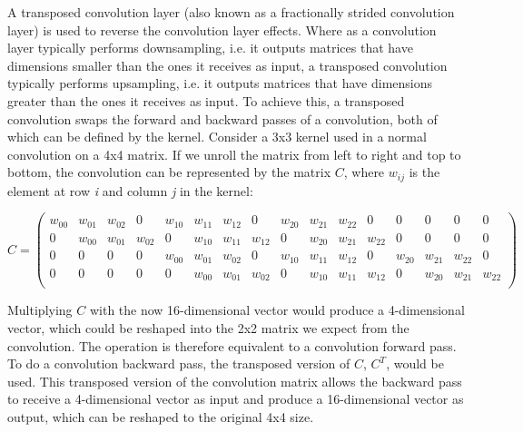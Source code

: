 \noindent A transposed convolution layer (also known as a fractionally strided convolution layer) is used to reverse the convolution layer effects. Where as a convolution layer typically performs downsampling, i.e. it outputs matrices that have dimensions smaller than the ones it receives as input, a transposed convolution typically performs upsampling, i.e. it outputs matrices that have dimensions greater than the ones it receives as input. To achieve this, a transposed convolution swaps the forward and backward passes of a convolution, both of which can be defined by the kernel. Consider a 3x3 kernel used in a normal convolution on a 4x4 matrix. If we unroll the matrix from left to right and top to bottom, the convolution can be represented by the matrix $C$, where \textit{$w_{ij}$} is the element at row \textit{i} and column \textit{j} in the kernel:

\[
    C = 
    \left(
    \begin{smallmatrix}
    \textit{$w_{00}$} & \textit{$w_{01}$} & \textit{$w_{02}$} & 0 & 
    \textit{$w_{10}$} & \textit{$w_{11}$} & \textit{$w_{12}$} & 0 & 
    \textit{$w_{20}$} & \textit{$w_{21}$} & \textit{$w_{22}$} & 0 & 
    0 & 0 & 0 & 0\\
    0 & \textit{$w_{00}$} & \textit{$w_{01}$} & \textit{$w_{02}$} & 
    0 & \textit{$w_{10}$} & \textit{$w_{11}$} & \textit{$w_{12}$} & 
    0 & \textit{$w_{20}$} & \textit{$w_{21}$} & \textit{$w_{22}$} & 
    0 & 0 & 0 & 0\\
    0 & 0 & 0 & 0 & 
    \textit{$w_{00}$} & \textit{$w_{01}$} & \textit{$w_{02}$} & 0 & 
    \textit{$w_{10}$} & \textit{$w_{11}$} & \textit{$w_{12}$} & 0 & 
    \textit{$w_{20}$} & \textit{$w_{21}$} & \textit{$w_{22}$} & 0\\
    0 & 0 & 0 & 0 & 
    0 & \textit{$w_{00}$} & \textit{$w_{01}$} & \textit{$w_{02}$} & 
    0 & \textit{$w_{10}$} & \textit{$w_{11}$} & \textit{$w_{12}$} & 
    0 & \textit{$w_{20}$} & \textit{$w_{21}$} & \textit{$w_{22}$}\\
    \end{smallmatrix}
    \right)
\]

\noindent Multiplying $C$ with the now 16-dimensional vector would produce a 4-dimensional vector, which could be reshaped into the 2x2 matrix we expect from the convolution. The operation is therefore equivalent to a convolution forward pass. To do a convolution backward pass, the transposed version of $C$, $C^T$, would be used. This transposed version of the convolution matrix allows the backward pass to receive a 4-dimensional vector as input and produce a 16-dimensional vector as output, which can be reshaped to the original 4x4 size. \\

